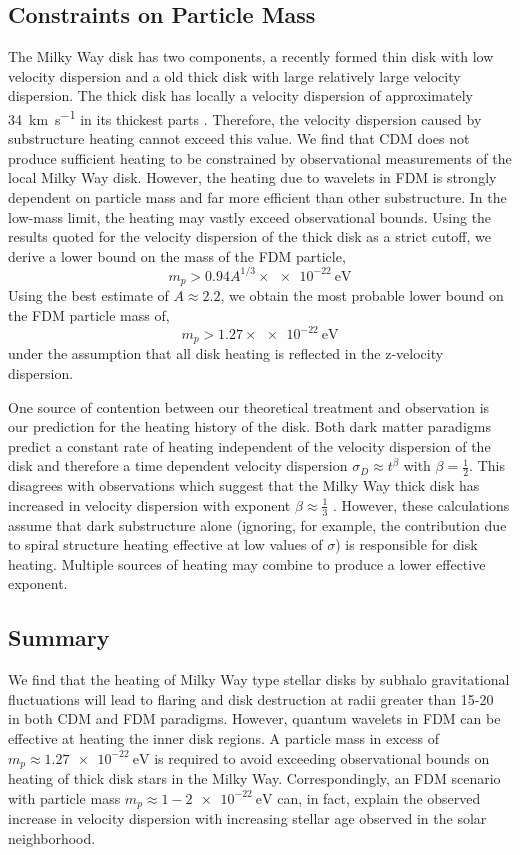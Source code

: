 \documentclass[usenatbib]{mnras}
\begin{document}
\subsection{Constraints on Particle Mass}

The Milky Way disk has two components, a recently formed thin disk with low velocity dispersion and a old thick disk with large relatively large velocity dispersion. The thick disk has locally a velocity dispersion of approximately \SI{34}{\kilo\meter\per\second} in its thickest parts \citep{milky_way}. Therefore, the velocity dispersion caused by substructure heating cannot exceed this value. We find that CDM does not produce sufficient heating to be constrained by observational measurements of the local  Milky Way disk. However, the heating due to wavelets in FDM is strongly dependent on particle mass and far more efficient than other substructure. In the low-mass limit, the heating may vastly exceed observational bounds. Using the results quoted for the velocity dispersion of the thick disk as a strict cutoff, we derive a lower bound on the mass of the FDM particle,
\begin{equation}
m_p > 0.94 A^{1/3} \times \SI{e-22}{\electronvolt}
\end{equation}
Using the best estimate of $A \approx 2.2$, we obtain the most probable lower bound on the FDM particle mass of,
\[ m_p > 1.27 \times \SI{e-22}{\electronvolt} \]
under the assumption that all disk heating is reflected in the z-velocity dispersion.
\par
One source of contention between our theoretical treatment and observation is our prediction for the heating history of the disk. Both dark matter paradigms predict a constant rate of heating independent of the velocity dispersion of the disk and therefore a time dependent velocity dispersion $\sigma_D \approx t^{\beta}$ with $\beta = \tfrac{1}{2}$. This disagrees with observations which suggest that the Milky Way thick disk has increased in velocity dispersion with exponent $\beta \approx \tfrac{1}{3}$ \citep{heating_history}. However, these calculations assume that dark substructure alone (ignoring, for example, the contribution due to spiral structure heating effective at low values of $\sigma$) is responsible for disk heating. Multiple sources of heating may combine to produce a lower effective exponent. 


\subsection{Summary}
We find that the heating of Milky Way type stellar disks by subhalo gravitational fluctuations will lead to flaring and disk destruction at radii greater than 15-\SI{20}{\kilo\parsec} in both CDM and FDM paradigms. However, quantum wavelets in FDM can be effective at heating the inner disk regions. A particle mass in excess of $m_p \approx \SI{1.27 e-22}{\electronvolt}$ is required to avoid exceeding observational bounds on heating of thick disk stars in the Milky Way. Correspondingly, an FDM scenario with particle mass $m_p \approx 1-\SI{2e-22}{\electronvolt}$ can, in fact, explain the observed increase in velocity dispersion with increasing stellar age observed in the solar neighborhood.    
\end{document}
